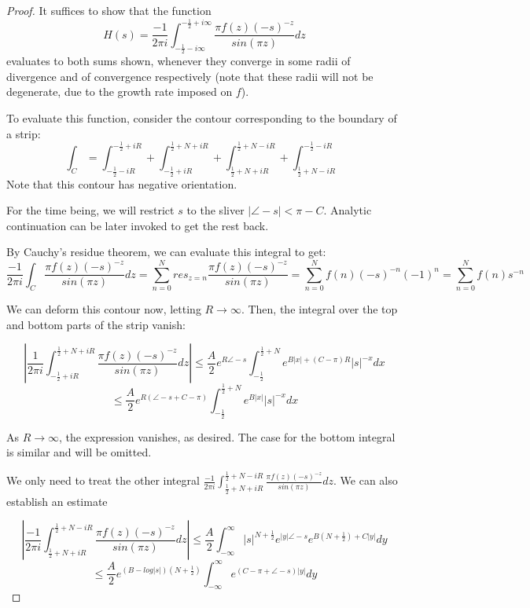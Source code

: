 \documentclass{article}
\begin{document}
	\begin{proof}
		It suffices to show that the function $$ H(s) = \frac{-1}{2 \pi i} \int_{-\frac{1}{2} - i \infty}^{-\frac{1}{2} + i \infty} \frac{\pi f(z) (-s)^{-z}}{ sin( \pi z ) } dz $$ evaluates to both sums shown, whenever they converge in some radii of divergence and of convergence respectively (note that these radii will not be degenerate, due to the growth rate imposed on $f$). 
		
		To evaluate this function, consider the contour corresponding to the boundary of a strip:
		$$ \int_{C} = \int_{-\frac{1}{2} - i R}^{-\frac{1}{2} + i R} + \int_{-\frac{1}{2} + i R}^{ \frac{1}{2} + N + i R } + \int_{ \frac{1}{2} + N + i R}^{ \frac{1}{2} + N - i R} + \int_{ \frac{1}{2} + N - i R }^{-\frac{1}{2} - i R} $$
		Note that this contour has negative orientation. 
		
		For the time being, we will restrict $s$ to the sliver $ \left| \angle -s \right| < \pi - C $. Analytic continuation can be later invoked to get the rest back. 
		
		By Cauchy's residue theorem, we can evaluate this integral to get:
		$$ \frac{-1}{2 \pi i} \int_{C} \frac{\pi f(z) (-s)^{-z}}{ sin( \pi z ) } dz = \sum_{n=0}^{N} res_{z=n} \frac{\pi f(z) (-s)^{-z}}{ sin( \pi z ) } =  \sum_{n=0}^{N} f(n) (-s)^{-n} (-1)^{n} = \sum_{n=0}^{N} f(n) s^{-n} $$
		
		We can deform this contour now, letting $R \rightarrow \infty$. Then, the integral over the top and bottom parts of the strip vanish:
		
		$$ \left| \frac{1}{2 \pi i} \int_{-\frac{1}{2} + i R}^{ \frac{1}{2} + N + i R }  \frac{\pi f(z) (-s)^{-z}}{ sin( \pi z ) } dz \right| 
		\leq \frac{A}{ 2 } e^{R \angle -s} \int_{-\frac{1}{2} }^{ \frac{1}{2} + N } e^{ B \left| x \right| + ( C - \pi ) R } \left| s \right|^{-x} dx $$
		$$ \leq \frac{A}{ 2 } e^{R \left( \angle -s + C - \pi \right)} \int_{-\frac{1}{2} }^{ \frac{1}{2} + N } e^{ B \left| x \right| } \left| s \right|^{-x} dx $$
		
		As $R \rightarrow \infty$, the expression vanishes, as desired. The case for the bottom integral is similar and will be omitted. 
		
		We only need to treat the other integral $ \frac{-1}{2 \pi i} \int_{ \frac{1}{2} + N + i R}^{ \frac{1}{2} + N - i R} \frac{\pi f(z) (-s)^{-z}}{ sin( \pi z ) } dz $. 
		We can also establish an estimate
		
		$$ \left|\frac{-1}{2 \pi i} \int_{ \frac{1}{2} + N + i R}^{ \frac{1}{2} + N - i R} \frac{\pi f(z) (-s)^{-z}}{ sin( \pi z ) } dz \right| \leq \frac{A}{2} \int_{-\infty}^{\infty} \left| s \right|^{N+\frac{1}{2}} e^{ \left| y \right| \angle -s} e^{ B (N + \frac{1}{2}) + C \left| y \right| }  dy $$
		$$ \leq \frac{A}{2} e^{ ( B - log \left| s \right| ) (N + \frac{1}{2}) } \int_{-\infty}^{\infty} e^{ ( C - \pi + \angle -s ) \left| y \right|} dy $$
		

\end{proof}
\end{document}
